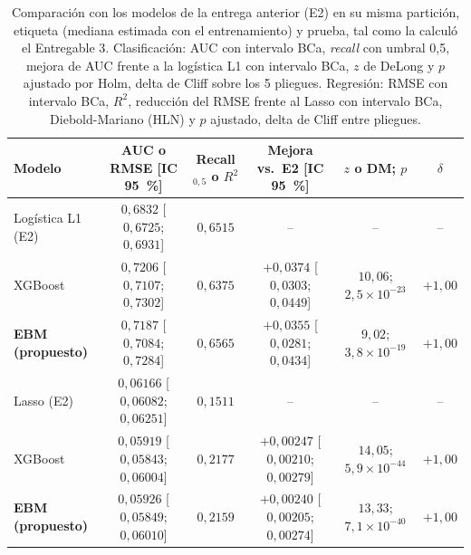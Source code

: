 \begin{table}[tbp]
  \centering\scriptsize\setlength{\tabcolsep}{2pt}
  \caption{Comparación con los modelos de la entrega anterior (E2) en su misma partición, etiqueta (mediana estimada con el entrenamiento) y prueba, tal como la calculó el Entregable 3. Clasificación: AUC con intervalo BCa, \emph{recall} con umbral 0,5, mejora de AUC frente a la logística L1 con intervalo BCa, $z$ de DeLong y $p$ ajustado por Holm, delta de Cliff sobre los 5 pliegues. Regresión: RMSE con intervalo BCa, $R^2$, reducción del RMSE frente al Lasso con intervalo BCa, Diebold-Mariano (HLN) y $p$ ajustado, delta de Cliff entre pliegues.}
  \label{tab:entrega2}
  \begin{tabular}{@{}l c c c c c@{}}
    \toprule
    Modelo & AUC o RMSE [IC 95~\%] & Recall$_{0{,}5}$ o $R^2$ & Mejora vs.\ E2 [IC 95~\%] & $z$ o DM; $p$ & $\delta$ \\
    \midrule
    Logística L1 (E2) & $0{,}6832$ [$0{,}6725$; $0{,}6931$] & $0{,}6515$ & -- & -- & -- \\
    XGBoost & $0{,}7206$ [$0{,}7107$; $0{,}7302$] & $0{,}6375$ & $+0{,}0374$ [$0{,}0303$; $0{,}0449$] & $10{,}06$; $2{,}5 \times 10^{-23}$ & $+1{,}00$ \\
    \textbf{EBM (propuesto)} & $0{,}7187$ [$0{,}7084$; $0{,}7284$] & $0{,}6565$ & $+0{,}0355$ [$0{,}0281$; $0{,}0434$] & $9{,}02$; $3{,}8 \times 10^{-19}$ & $+1{,}00$ \\
    \midrule
    Lasso (E2) & $0{,}06166$ [$0{,}06082$; $0{,}06251$] & $0{,}1511$ & -- & -- & -- \\
    XGBoost & $0{,}05919$ [$0{,}05843$; $0{,}06004$] & $0{,}2177$ & $+0{,}00247$ [$0{,}00210$; $0{,}00279$] & $14{,}05$; $5{,}9 \times 10^{-44}$ & $+1{,}00$ \\
    \textbf{EBM (propuesto)} & $0{,}05926$ [$0{,}05849$; $0{,}06010$] & $0{,}2159$ & $+0{,}00240$ [$0{,}00205$; $0{,}00274$] & $13{,}33$; $7{,}1 \times 10^{-40}$ & $+1{,}00$ \\
    \bottomrule
  \end{tabular}
\end{table}
